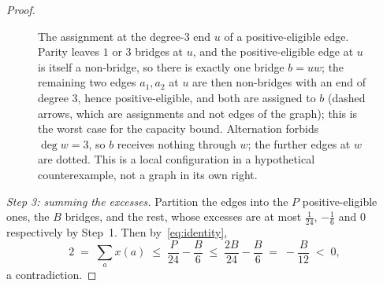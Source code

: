 \documentclass{baustms}
\theoremstyle{cupthm}
\theoremstyle{cupdefn}
\theoremstyle{cuprem}
\begin{document}
\begin{proof}
\begin{figure}[ht]
\centering
{}
\caption{The assignment at the degree-$3$ end $u$ of a positive-eligible edge.
Parity leaves $1$ or $3$ bridges at $u$, and the positive-eligible edge at $u$
is itself a non-bridge, so there is exactly one bridge $b=uw$; the remaining two
edges $a_1,a_2$ at $u$ are then non-bridges with an end of degree $3$, hence
positive-eligible, and both are assigned to $b$ (dashed arrows, which are
assignments and not edges of the graph); this is the worst case for the
capacity bound. Alternation forbids
$\deg w = 3$, so $b$ receives nothing through $w$; the further edges at $w$ are
dotted. This is a local configuration in a hypothetical counterexample, not a
graph in its own right.}\label{fig:assign}
\end{figure}

\smallskip
\emph{Step 3: summing the excesses.} Partition the edges into the $P$
positive-eligible ones, the $B$ bridges, and the rest, whose excesses are at most
$\tfrac1{24}$, $-\tfrac16$ and $0$ respectively by Step~1. Then
by~\eqref{eq:identity},
\begin{equation}\label{eq:final}
  2 \;=\; \sum_a x(a) \;\le\; \frac{P}{24} - \frac{B}{6}
     \;\le\; \frac{2B}{24} - \frac{B}{6} \;=\; -\frac{B}{12} \;<\; 0 ,
\end{equation}
a contradiction.
\end{proof}
\end{document}
